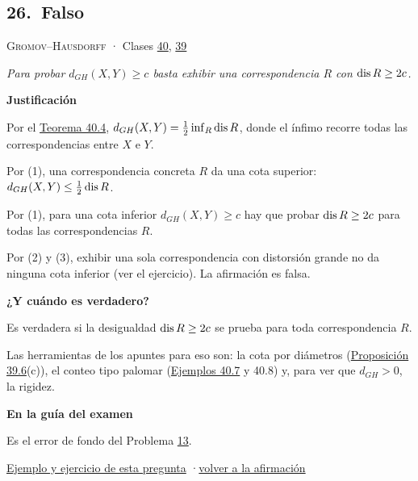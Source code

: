 \documentclass[11pt,a4paper]{article}
\newcommand{\bloque}[1]{\par\smallskip\noindent\textbf{\color{acento}#1}\par}
\begin{document}
\subsection*{\hypertarget{r-26}{}26.\ \textcolor{bad}{Falso}}
{\small \textsc{Gromov–Hausdorff} · Clases \href{https://decostruttivismo.github.io/MAT2514-repaso/pdf/MAT2514_apuntes_completos.pdf\#nameddest=section.40}{40}, \href{https://decostruttivismo.github.io/MAT2514-repaso/pdf/MAT2514_apuntes_completos.pdf\#nameddest=section.39}{39}}\par
\emph{Para probar $d_{GH}(X,Y)\ge c$ basta exhibir una correspondencia $R$ con $\operatorname{dis} R\ge2c$.}
\bloque{Justificación}
\begin{pasos}
\item[(1)] Por el \href{https://decostruttivismo.github.io/MAT2514-repaso/pdf/MAT2514_apuntes_completos.pdf\#nameddest=teorema.40.4}{Teorema 40.4}, $d_{GH}(X,Y)=\frac12\inf_R\operatorname{dis} R$, donde el ínfimo recorre todas las correspondencias entre $X$ e $Y$.
\item[(2)] Por (1), una correspondencia concreta $R$ da una cota superior: $d_{GH}(X,Y)\le\frac12\operatorname{dis} R$.
\item[(3)] Por (1), para una cota inferior $d_{GH}(X,Y)\ge c$ hay que probar $\operatorname{dis} R\ge2c$ para todas las correspondencias $R$.
\item[] Por (2) y (3), exhibir una sola correspondencia con distorsión grande no da ninguna cota inferior (ver el ejercicio). La afirmación es falsa.
\end{pasos}
\bloque{¿Y cuándo es verdadero?}
\begin{pasos}
\item[] Es verdadera si la desigualdad $\operatorname{dis} R\ge2c$ se prueba para toda correspondencia $R$.
\item[] Las herramientas de los apuntes para eso son: la cota por diámetros (\href{https://decostruttivismo.github.io/MAT2514-repaso/pdf/MAT2514_apuntes_completos.pdf\#nameddest=teorema.39.6}{Proposición 39.6}(c)), el conteo tipo palomar (\href{https://decostruttivismo.github.io/MAT2514-repaso/pdf/MAT2514_apuntes_completos.pdf\#nameddest=teorema.40.7}{Ejemplos 40.7} y 40.8) y, para ver que $d_{GH}\gt 0$, la rigidez.
\end{pasos}
\bloque{En la guía del examen}
\begin{pasos}
\item[] Es el error de fondo del Problema \hyperlink{prob-13}{13}.
\end{pasos}
\par{}
\par{\small \hyperlink{e-26}{Ejemplo y ejercicio de esta pregunta} \quad·\quad \hyperlink{q-26}{volver a la afirmación}}
\end{document}
